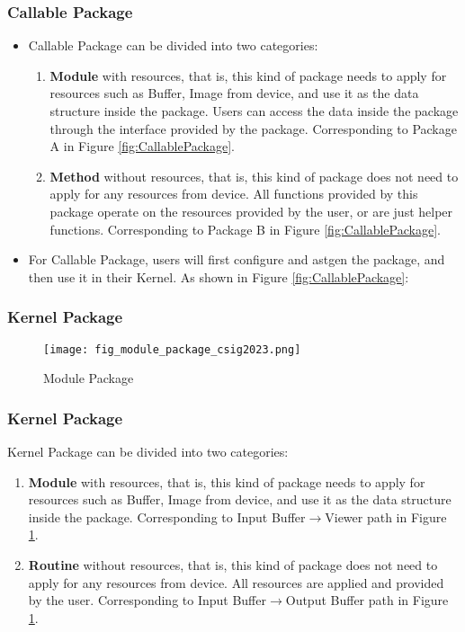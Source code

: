 \begin{frame}
    \frametitle{Callable Package}
    \begin{itemize}
        \item Callable Package can be divided into two categories:
        \begin{enumerate}
            \item \textbf{Module} with resources, that is, this kind of package needs to apply for resources such as Buffer, Image from device, and use it as the data structure inside the package. Users can access the data inside the package through the interface provided by the package. Corresponding to Package A in Figure \ref{fig:CallablePackage}.
            \item \textbf{Method} without resources, that is, this kind of package does not need to apply for any resources from device. All functions provided by this package operate on the resources provided by the user, or are just helper functions. Corresponding to Package B in Figure \ref{fig:CallablePackage}.
        \end{enumerate}
        \item For Callable Package, users will first configure and astgen the package, and then use it in their Kernel. As shown in Figure \ref{fig:CallablePackage}:
    \end{itemize}
\end{frame}

\begin{frame}
    \frametitle{Kernel Package}
    \begin{figure}[H]
        \centering
        \texttt{[image: fig\_module\_package\_csig2023.png]}
        \caption{Module Package}
        \label{fig:ModulePackage}
    \end{figure}
\end{frame}

\begin{frame}
    \frametitle{Kernel Package}

    Kernel Package can be divided into two categories:
    \begin{enumerate}
        \item \textbf{Module} with resources, that is, this kind of package needs to apply for resources such as Buffer, Image from device, and use it as the data structure inside the package. Corresponding to Input Buffer$\rightarrow$Viewer path in Figure \ref{fig:ModulePackage}.
        \item \textbf{Routine} without resources, that is, this kind of package does not need to apply for any resources from device. All resources are applied and provided by the user. Corresponding to Input Buffer$\rightarrow$Output Buffer path in Figure \ref{fig:ModulePackage}.
    \end{enumerate}
\end{frame}